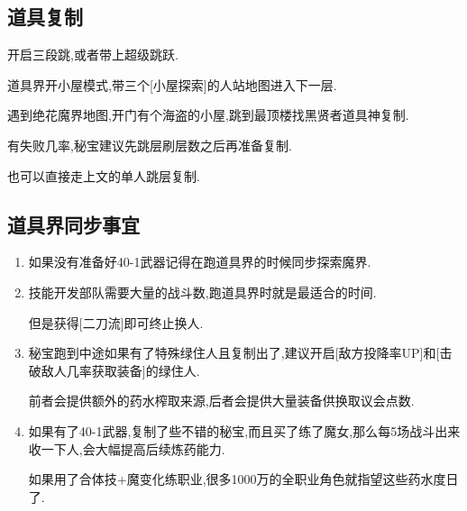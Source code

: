 	\subsection{道具复制}

	开启三段跳,或者带上超级跳跃.

	道具界开小屋模式,带三个[小屋探索]的人站地图进入下一层.

	遇到绝花魔界地图,开门有个海盗的小屋,跳到最顶楼找黑贤者道具神复制.

	有失败几率,秘宝建议先跳层刷层数之后再准备复制.

	也可以直接走上文的单人跳层复制.

	\subsection{道具界同步事宜}

	\begin{enumerate}
		\item
		如果没有准备好40-1武器记得在跑道具界的时候同步探索魔界.

		\item
		技能开发部队需要大量的战斗数,跑道具界时就是最适合的时间.

		但是获得[二刀流]即可终止换人.

		\item
		秘宝跑到中途如果有了特殊绿住人且复制出了,建议开启[敌方投降率UP]和[击破敌人几率获取装备]的绿住人.

		前者会提供额外的药水榨取来源,后者会提供大量装备供换取议会点数.

		\item
		如果有了40-1武器,复制了些不错的秘宝,而且买了练了魔女,那么每5场战斗出来收一下人,会大幅提高后续炼药能力.

		如果用了合体技+魔变化练职业,很多1000万的全职业角色就指望这些药水度日了.

	\end{enumerate}

